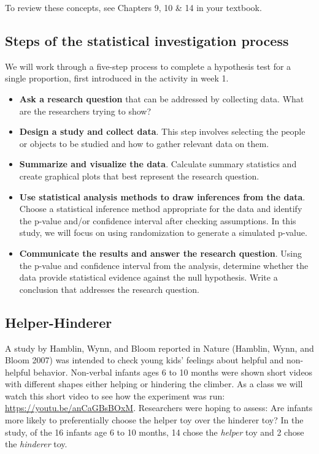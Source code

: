 \documentclass[
]{report}
\begin{document}
To review these concepts, see Chapters 9, 10 \& 14 in your textbook.

\hypertarget{steps-of-the-statistical-investigation-process-1}{%
\subsection{Steps of the statistical investigation process}\label{steps-of-the-statistical-investigation-process-1}}

We will work through a five-step process to complete a hypothesis test for a single proportion, first introduced in the activity in week 1.

\begin{itemize}
\item
  \textbf{Ask a research question} that can be addressed by collecting data. What are the researchers trying to show?
\item
  \textbf{Design a study and collect data}. This step involves selecting the people or objects to be studied and how to gather relevant data on them.
\item
  \textbf{Summarize and visualize the data}. Calculate summary statistics and create graphical plots that best represent the research question.
\item
  \textbf{Use statistical analysis methods to draw inferences from the data}. Choose a statistical inference method appropriate for the data and identify the p-value and/or confidence interval after checking assumptions. In this study, we will focus on using randomization to generate a simulated p-value.
\item
  \textbf{Communicate the results and answer the research question}. Using the p-value and confidence interval from the analysis, determine whether the data provide statistical evidence against the null hypothesis. Write a conclusion that addresses the research question.
\end{itemize}

\newpage

\hypertarget{helper-hinderer}{%
\subsection{Helper-Hinderer}\label{helper-hinderer}}

A study by Hamblin, Wynn, and Bloom reported in Nature (Hamblin, Wynn, and Bloom 2007) was intended to check young kids' feelings about helpful and non-helpful behavior. Non-verbal infants ages 6 to 10 months were shown short videos with different shapes either helping or hindering the climber. As a class we will watch this short video to see how the experiment was run: \url{https://youtu.be/anCaGBsBOxM}. Researchers were hoping to assess: Are infants more likely to preferentially choose the helper toy over the hinderer toy? In the study, of the 16 infants age 6 to 10 months, 14 chose the \emph{helper} toy and 2 chose the \emph{hinderer} toy.
\end{document}

